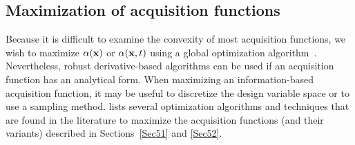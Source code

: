 \documentclass[iicol,sn-basic]{sn-jnl}%
\begin{document}
\subsection{Maximization of acquisition functions}\label{Sec54}

Because it is difficult to examine the convexity of most acquisition functions, we wish to maximize $\alpha({\bf x})$ or $\alpha({\bf x},t)$ using a global optimization algorithm~\citep{Neumaier2004}.
Nevertheless, robust derivative-based algorithms can be used if an acquisition function has an analytical form.
When maximizing an information-based acquisition function, it may be useful to discretize the design variable space or to use a sampling method.
 lists several optimization algorithms and techniques that are found in the literature to maximize the acquisition functions (and their variants) described in Sections~\ref{Sec51} and \ref{Sec52}.
\end{document}
